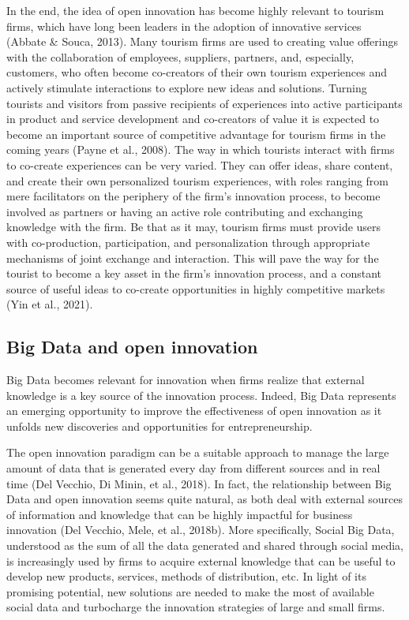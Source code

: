 \documentclass[
  letterpaper,
  DIV=11,
  numbers=noendperiod]{scrreprt}
\begin{document}
In the end, the idea of open innovation has become highly relevant to
tourism firms, which have long been leaders in the adoption of
innovative services (Abbate \& Souca, 2013). Many tourism firms are used
to creating value offerings with the collaboration of employees,
suppliers, partners, and, especially, customers, who often become
co-creators of their own tourism experiences and actively stimulate
interactions to explore new ideas and solutions. Turning tourists and
visitors from passive recipients of experiences into active participants
in product and service development and co-creators of value it is
expected to become an important source of competitive advantage for
tourism firms in the coming years (Payne et al., 2008). The way in which
tourists interact with firms to co-create experiences can be very
varied. They can offer ideas, share content, and create their own
personalized tourism experiences, with roles ranging from mere
facilitators on the periphery of the firm's innovation process, to
become involved as partners or having an active role contributing and
exchanging knowledge with the firm. Be that as it may, tourism firms
must provide users with co-production, participation, and
personalization through appropriate mechanisms of joint exchange and
interaction. This will pave the way for the tourist to become a key
asset in the firm's innovation process, and a constant source of useful
ideas to co-create opportunities in highly competitive markets (Yin et
al., 2021).

\hypertarget{big-data-and-open-innovation}{%
\subsection{Big Data and open
innovation}\label{big-data-and-open-innovation}}

Big Data becomes relevant for innovation when firms realize that
external knowledge is a key source of the innovation process. Indeed,
Big Data represents an emerging opportunity to improve the effectiveness
of open innovation as it unfolds new discoveries and opportunities for
entrepreneurship.

The open innovation paradigm can be a suitable approach to manage the
large amount of data that is generated every day from different sources
and in real time (Del Vecchio, Di Minin, et al., 2018). In fact, the
relationship between Big Data and open innovation seems quite natural,
as both deal with external sources of information and knowledge that can
be highly impactful for business innovation (Del Vecchio, Mele, et al.,
2018b). More specifically, Social Big Data, understood as the sum of all
the data generated and shared through social media, is increasingly used
by firms to acquire external knowledge that can be useful to develop new
products, services, methods of distribution, etc. In light of its
promising potential, new solutions are needed to make the most of
available social data and turbocharge the innovation strategies of large
and small firms.
\end{document}
